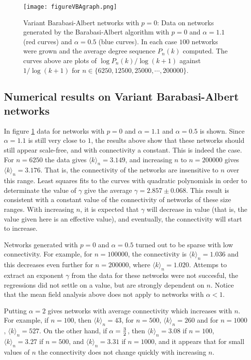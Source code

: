 \documentclass[12pt]{iopart}
\def\sfrac#1#2{\hbox{\normalsize $\frac{#1}{#2}$}}
\begin{document}
\begin{figure}[t!]
 \centering
\texttt{[image: figureVBAgraph.png]}
\caption{{Variant Barabasi-Albert networks with $p=0$:}
Data on networks generated by the Barabasi-Albert algorithm with $p=0$ and $\alpha=1.1$
(red curves) and $\alpha=0.5$ (blue curves).  In each case $100$ networks were grown and 
the average degree sequence $P_n(k)$ computed.  The curves above
are plots of $\log P_n(k)/\log (k+1)$ against $1/\log (k+1)$ for $n\in\{6250,12500,25000,\cdots,200000\}$.
}
\label{figureVBAgraph}
\end{figure}


\subsection{Numerical results on Variant Barabasi-Albert networks}

In figure \ref{figureVBAgraph} data for networks with $p=0$ and $\alpha=1.1$ and $\alpha=0.5$
is shown.  Since $\alpha=1.1$ is still very close to $1$, the results above show that these
networks should still appear scale-free, and with connectivity a constant.  This is indeed the
case.  For $n=6250$ the data gives $\langle k \rangle_n = 3.149$, and increasing
$n$ to $n=200000$ gives $\langle k \rangle_n = 3.176$.  That is, the connectivity of the
networks are insensitive to $n$ over this range.  Least squares fits to the curves with quadratic
polynomials in order to determinate the value of $\gamma$ give the average
$\gamma = 2.857\pm 0.068$.  This result is consistent with a constant value of 
the connectivity of networks of these size ranges.  With increasing $n$, it is expected
that $\gamma $ will decrease in value (that is, the value given here is an effective
value), and eventually, the connectivity will start to increase.

Networks generated with $p=0$ and $\alpha=0.5$ turned out to be sparse with
low connectivity.  For example, for $n=100000$, the connectivity is $\langle k \rangle_n=1.036$
and this decreases even further for $n=200000$, where $\langle k \rangle_n = 1.020$.
Attemps to extract an exponent $\gamma$ from the data for these networks were not succesful,
the regressions did not settle on a value, but are strongly dependent on $n$.  Notice that
the mean field analysis above does not apply to networks with $\alpha < 1$.

Putting $\alpha=2$ gives networks with average connectivity which increases with
$n$.  For example,  if $n=100$, then $\langle k \rangle_n = 43$, for $n=500$, 
$\langle k \rangle_n = 260$ and for $n=1000$, $\langle k \rangle_n = 527$.  
On the other hand, if $\alpha = \sfrac{3}{2}$, then  $\langle k \rangle_n = 3.08$ if $n=100$,
$\langle k \rangle_n = 3.27$ if $n=500$, and $\langle k \rangle_n = 3.31$ if $n=1000$, 
and it appears that for small values of $n$ the connectivity does not change quickly
with increasing $n$.
\end{document}
